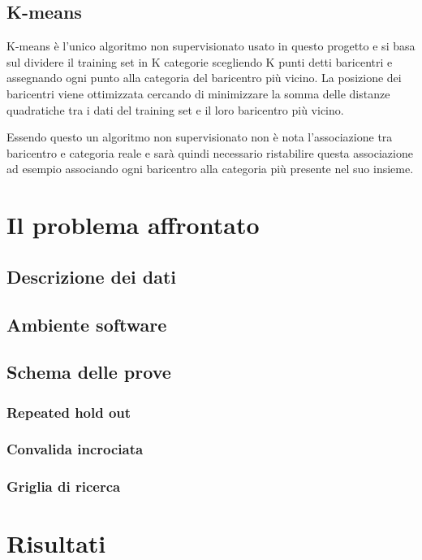 \documentclass[a4paper,12pt]{report}
\begin{document}
\section{K-means}

K-means è l'unico algoritmo non supervisionato usato in questo progetto e si
basa sul dividere il training set in K categorie scegliendo K punti detti
baricentri e assegnando ogni punto alla categoria del baricentro più vicino. La
posizione dei baricentri viene ottimizzata cercando di minimizzare la somma
delle distanze quadratiche tra i dati del training set e il loro baricentro più
vicino. 

Essendo questo un algoritmo non supervisionato non è nota l'associazione tra
baricentro e categoria reale e sarà quindi necessario ristabilire questa
associazione ad esempio associando ogni baricentro alla categoria più presente
nel suo insieme.


% 
% 
\chapter{Il problema affrontato}
\label{cap2}
\section{Descrizione dei dati}
\section{Ambiente software}
\section{Schema delle prove}
\subsection{Repeated hold out}
\subsection{Convalida incrociata}
\subsection{Griglia di ricerca}


% 
% 
\chapter{Risultati}
\label{cap3}
\end{document}
